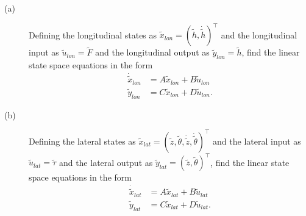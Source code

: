 	\begin{description}
	\item[(a)] Defining the longitudinal states as $\tilde{x}_{lon}=(\tilde{h}, \dot{\tilde{h}})^\top$ and the longitudinal input as $\tilde{u}_{lon}=\tilde{F}$ and the longitudinal output as $\tilde{y}_{lon} = \tilde{h}$, find the linear state space equations in the form
	\begin{align*}
		\dot{\tilde{x}}_{lon} &= A\tilde{x}_{lon} + B\tilde{u}_{lon} \\
		\tilde{y}_{lon} &= C\tilde{x}_{lon} + D\tilde{u}_{lon}.
	\end{align*}
	\item[(b)] Defining the lateral states as $\tilde{x}_{lat}=(\tilde{z}, \tilde{\theta}, \dot{\tilde{z}}, \dot{\tilde{\theta}})^\top$ and the lateral input as $\tilde{u}_{lat}=\tilde{\tau}$ and the lateral output as $\tilde{y}_{lat} = (\tilde{z}, \tilde{\theta})^\top$, find the linear state space equations in the form
	\begin{align*}
		\dot{\tilde{x}}_{lat} &= A\tilde{x}_{lat} + B\tilde{u}_{lat} \\
		\tilde{y}_{lat} &= C\tilde{x}_{lat} + D\tilde{u}_{lat}.
	\end{align*}
	\end{description}
